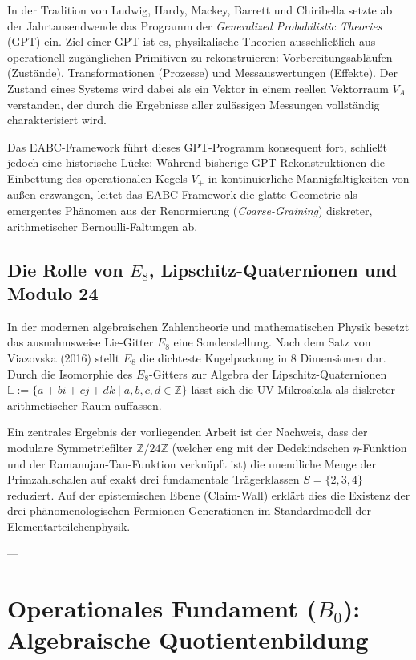 \documentclass[11pt,a4paper]{article}
\begin{document}
In der Tradition von Ludwig, Hardy, Mackey, Barrett und Chiribella setzte ab der Jahrtausendwende das Programm der \emph{Generalized Probabilistic Theories} (GPT) ein. Ziel einer GPT ist es, physikalische Theorien ausschließlich aus operationell zugänglichen Primitiven zu rekonstruieren: Vorbereitungsabläufen (Zustände), Transformationen (Prozesse) und Messauswertungen (Effekte). Der Zustand eines Systems wird dabei als ein Vektor in einem reellen Vektorraum $V_A$ verstanden, der durch die Ergebnisse aller zulässigen Messungen vollständig charakterisiert wird.

Das EABC-Framework führt dieses GPT-Programm konsequent fort, schließt jedoch eine historische Lücke: Während bisherige GPT-Rekonstruktionen die Einbettung des operationalen Kegels $V_+$ in kontinuierliche Mannigfaltigkeiten von außen erzwangen, leitet das EABC-Framework die glatte Geometrie als emergentes Phänomen aus der Renormierung (\emph{Coarse-Graining}) diskreter, arithmetischer Bernoulli-Faltungen ab.

\subsection{Die Rolle von $E_8$, Lipschitz-Quaternionen und Modulo 24}

In der modernen algebraischen Zahlentheorie und mathematischen Physik besetzt das ausnahmsweise Lie-Gitter $E_8$ eine Sonderstellung. Nach dem Satz von Viazovska (2016) stellt $E_8$ die dichteste Kugelpackung in 8 Dimensionen dar. Durch die Isomorphie des $E_8$-Gitters zur Algebra der Lipschitz-Quaternionen $\mathbb{L} := \{a + bi + cj + dk \mid a,b,c,d \in \mathbb{Z}\}$ lässt sich die UV-Mikroskala als diskreter arithmetischer Raum auffassen.

Ein zentrales Ergebnis der vorliegenden Arbeit ist der Nachweis, dass der modulare Symmetriefilter $\mathbb{Z}/24\mathbb{Z}$ (welcher eng mit der Dedekindschen $\eta$-Funktion und der Ramanujan-Tau-Funktion verknüpft ist) die unendliche Menge der Primzahlschalen auf exakt drei fundamentale Trägerklassen $S = \{2, 3, 4\}$ reduziert. Auf der epistemischen Ebene (Claim-Wall) erklärt dies die Existenz der drei phänomenologischen Fermionen-Generationen im Standardmodell der Elementarteilchenphysik.

---

\section{Operationales Fundament ($B_0$): Algebraische Quotientenbildung}
\end{document}

